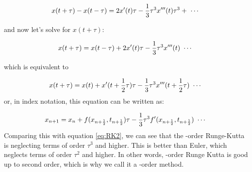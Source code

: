 \begin{equation}\label{eq:TaylorDiff}
   x(t+\tau) -  x(t-\tau) =  2 x'(t) \tau 
    - {1\over 3}\tau^3 x'''(t) \tau^3 + ~\cdots~
\end{equation}

and now let's solve for $x(t + \tau)$:

\begin{equation}\label{eq:TaylorDiff}
   x(t+\tau) =  x(t-\tau) +  2 x'(t) \tau 
    - {1\over 3}\tau^3 x'''(t) ~\cdots~
\end{equation}

which is equivalent to 

\begin{equation}\label{eq:TaylorDiff}
   x(t+\tau) =  x(t) +   x'(t + {1\over 2} \tau) \tau 
    - {1\over 3}\tau^3 x'''(t + {1\over 2} \tau) ~\cdots~
\end{equation}
or, in index notation, this equation can be written as:

\begin{equation}\label{eq:TaylorDiff}
   x_{n+1} =  x_n +   f(x_{n+{1\over 2}},t_{n+{1\over 2}}) \tau 
    - {1\over 3}\tau^3 f'(x_{n+{1\over 2}},t_{n+{1\over 2}}) ~\cdots~
\end{equation}
Comparing this with equation \eqref{eq:RK2}, we can see that the
-order Runge-Kutta is neglecting terms of order
$\tau^3$ and higher.  This is better than Euler, which neglects terms
of order $\tau^2$ and higher.  In other words, -order
Runge Kutta is good up to second order, which is why we call it a
-order method.   

